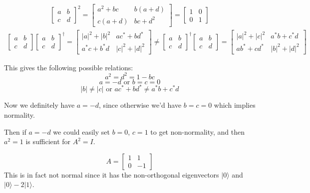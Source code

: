 \documentclass[]{article}
\newcommand{\ket}[1]{| #1 \rangle}
\newcommand{\ord}[1]{\left| #1 \right|}
\begin{document}
\begin{align*}
\left[\begin{matrix}
a&b\\
c&d
\end{matrix}\right]^2
=
\left[\begin{matrix}
a^2+bc&b(a+d)\\
c(a+d)&bc+d^2
\end{matrix}\right]
=
\left[\begin{matrix}
1&0\\
0&1
\end{matrix}\right]
\end{align*}
\begin{align*}
\left[\begin{matrix}
a&b\\
c&d
\end{matrix}\right]
\left[\begin{matrix}
a&b\\
c&d
\end{matrix}\right]^\dagger
=
\left[\begin{matrix}
\ord{a}^2+\ord{b}^2&ac^*+bd^*\\
a^*c+b^*d&\ord{c}^2+\ord{d}^2
\end{matrix}\right]
\neq
\left[\begin{matrix}
a&b\\
c&d
\end{matrix}\right]^\dagger
\left[\begin{matrix}
a&b\\
c&d
\end{matrix}\right]
=
\left[\begin{matrix}
\ord{a}^2+\ord{c}^2&a^*b+c^*d\\
ab^*+cd^*&\ord{b}^2+\ord{d}^2
\end{matrix}\right]
\end{align*}

This gives the following possible relations:
\[a^2=d^2=1-bc\]
\[a=-d \text{\ or\ } b = c = 0\]
\[\ord{b} \neq \ord{c} \text{\ or\ } ac^*+bd^* \neq a^*b+c^*d\]

Now we definitely have $a=-d$, since otherwise we'd have $b=c=0$ which implies normality.

Then if $a=-d$ we could easily set $b=0$, $c=1$ to get non-normality, and then $a^2=1$ is sufficient for $A^2=I$.

\[
A=\left[\begin{matrix}
1&1\\
0&-1
\end{matrix}\right]\]
This is in fact not normal since it has the non-orthogonal eigenvectors $\ket{0}$ and $\ket{0}-2\ket{1}$.
\end{document}
